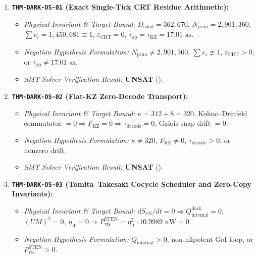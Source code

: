 \documentclass[11pt,onecolumn]{article}
\begin{document}
\begin{enumerate}
\begin{itemize}
        \item \emph{Negation Hypothesis Formulation:} Void power $\le$ Landauer debt, $P^{\text{III}}\le34.700\text{ YW}$, a quantum-inequality violation, or nonzero blue-sheet stress.
        \item \emph{SMT Solver Verification Result:} \textbf{UNSAT} ().
    \end{itemize}
    \item \textbf{\texttt{THM-DARK-OS-01} (Exact Single-Tick CRT Residue Arithmetic):}
    \begin{itemize}
        \item \emph{Physical Invariant \& Target Bound:} $D_{\text{cond}}=362{,}670$, $N_{\text{prim}}=2{,}901{,}360$, $\sum e_i=1{,}450{,}681\equiv1$, $\varepsilon_{\text{CRT}}=0$, $\tau_{\text{op}}=\tau_{\text{KZ}}=17.01\text{ as}$.
        \item \emph{Negation Hypothesis Formulation:} $N_{\text{prim}}\neq2{,}901{,}360$, $\sum e_i\not\equiv1$, $\varepsilon_{\text{CRT}}>0$, or $\tau_{\text{op}}\neq17.01\text{ as}$.
        \item \emph{SMT Solver Verification Result:} \textbf{UNSAT} ().
    \end{itemize}
    \item \textbf{\texttt{THM-DARK-OS-02} (Flat-KZ Zero-Decode Transport):}
    \begin{itemize}
        \item \emph{Physical Invariant \& Target Bound:} $\kappa=312+8=320$, Kohno--Drinfeld commutator $=0\Rightarrow F_{\text{KZ}}=0\Rightarrow\tau_{\text{decode}}=0$, Galois snap drift $=0$.
        \item \emph{Negation Hypothesis Formulation:} $\kappa\neq320$, $F_{\text{KZ}}\neq0$, $\tau_{\text{decode}}>0$, or nonzero drift.
        \item \emph{SMT Solver Verification Result:} \textbf{UNSAT} ().
    \end{itemize}
    \item \textbf{\texttt{THM-DARK-OS-03} (Tomita--Takesaki Cocycle Scheduler and Zero-Copy Invariants):}
    \begin{itemize}
        \item \emph{Physical Invariant \& Target Bound:} $dS_{\text{vN}}/dt=0\Rightarrow Q_{\text{internal}}^{\text{dark}}=0$, $(UM)^2=0$, $\eta_A=0\Rightarrow P_{\text{vis}}^{\text{STEN}}=\eta_A^2\cdot10.9989\text{ nW}=0$.
        \item \emph{Negation Hypothesis Formulation:} $Q_{\text{internal}}>0$, non-nilpotent GoI loop, or $P_{\text{vis}}^{\text{STEN}}>0$.

\end{itemize}
\end{enumerate}
\end{document}
